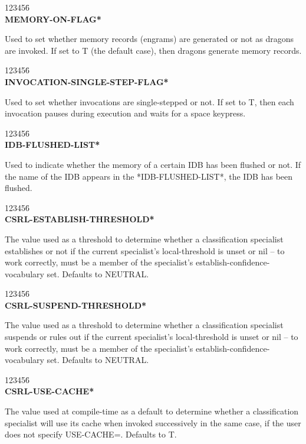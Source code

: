 \begin{tabbing}
123456\= \kill
\\
{\bf *MEMORY-ON-FLAG*}
\end{tabbing}
Used to set whether memory records (engrams) are generated or not as
dragons are invoked. If set to T (the default case), then dragons
generate memory records.

\begin{tabbing}
123456\= \kill
\\
{\bf *INVOCATION-SINGLE-STEP-FLAG*}
\end{tabbing}
Used to set whether invocations are single-stepped or not. If set to
T, then each invocation pauses during execution and waits for a space
keypress.

\begin{tabbing}
123456\= \kill
\\
{\bf *IDB-FLUSHED-LIST*}
\end{tabbing}
Used to indicate whether the memory of a certain IDB has been
flushed or not.  If the name of the IDB appears in the
*IDB-FLUSHED-LIST*, the IDB has been flushed.

\begin{tabbing}
123456\= \kill
\\
{\bf *CSRL-ESTABLISH-THRESHOLD*}
\end{tabbing}
The value used as a threshold to determine whether a classification
specialist establishes or not if the current specialist's
local-threshold is unset or nil -- to work correctly, must be a member
of the specialist's establish-confidence-vocabulary set.  Defaults to
NEUTRAL.

\begin{tabbing}
123456\= \kill
\\
{\bf *CSRL-SUSPEND-THRESHOLD*}
\end{tabbing}
The value used as a threshold to determine whether a classification
specialist suspends or rules out if the current specialist's
local-threshold is unset or nil -- to work correctly, must be a member
of the specialist's establish-confidence-vocabulary set.  Defaults to
NEUTRAL.


\begin{tabbing}
123456\= \kill
\\
{\bf *CSRL-USE-CACHE*}
\end{tabbing}
The value used at compile-time as a default to determine whether a
classification specialist will use its cache when invoked successively
in the same case, if the user does not specify USE-CACHE=. Defaults to
T.


